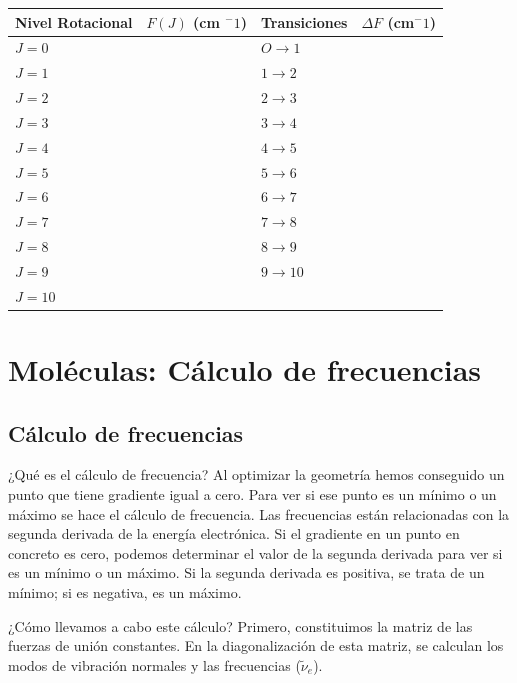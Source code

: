 \documentclass{tufte-book}
\begin{document}
\begin{table}[h!]
\centering
	\scriptsize
	\begin{tabular}{ll||ll}
	\toprule
	    Nivel Rotacional & $F (J)$ (cm $^-1$)& Transiciones & $\Delta F$ (cm$^-1$) \\
		\hline
            $J=0$  &  & $O\rightarrow1$ &   \\
            $J=1$  &  & $1\rightarrow2$ &   \\
            $J=2$  &  & $2\rightarrow3$ &   \\
            $J=3$  &  & $3\rightarrow4$ &   \\
            $J=4$  &  & $4\rightarrow5$ &   \\
            $J=5$  &  & $5\rightarrow6$ &   \\
            $J=6$  &  & $6\rightarrow7$ &   \\
            $J=7$  &  & $7\rightarrow8$ &   \\
            $J=8$  &  & $8\rightarrow9$ &   \\
            $J=9$  &  & $9\rightarrow10$&   \\
            $J=10$ &  &               &   \\
	\bottomrule	
    \end{tabular}
\end{table}


\chapter{Moléculas: Cálculo de frecuencias}

\section{Cálculo de frecuencias}
¿Qué es el cálculo de frecuencia? Al optimizar la geometría 
hemos conseguido un punto que tiene gradiente igual a cero.
Para ver si ese punto es un mínimo o un máximo se hace el 
cálculo de frecuencia. Las frecuencias están relacionadas
con la segunda derivada de la energía electrónica. Si el
gradiente en un punto en concreto es cero, podemos
determinar el valor de la segunda derivada para ver
si es un mínimo o un máximo. Si la segunda derivada es
positiva, se trata de un mínimo; si es negativa, es un
máximo.

¿Cómo llevamos a cabo este cálculo? Primero, constituimos
la matriz de las fuerzas de unión constantes. En la
diagonalización de esta matriz, se calculan los modos de
vibración normales y las frecuencias ($\tilde{\nu}_e$).
\end{document}

